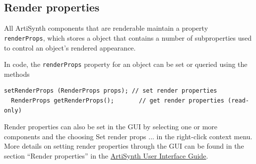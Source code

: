 
%
%


\subsection{Render properties}
\label{RenderProperties:sec}

All ArtiSynth components that are renderable maintain a property {\tt
renderProps}, which stores a
 object that contains a number
of subproperties used to control an object's rendered appearance.

In code, the {\tt renderProps} property for an object can be set or
queried using the methods
%
\begin{lstlisting}[]
  setRenderProps (RenderProps props); // set render properties
  RenderProps getRenderProps();       // get render properties (read-only)
\end{lstlisting}
%
Render properties can also be set in the GUI by selecting one or more
components and the choosing {\sf Set render props ...}  in the
right-click context menu. More details on setting render properties
through the GUI can be found in the section ``Render properties'' in the
\href{../uiguide/uiguide.html}{
ArtiSynth User Interface Guide}.

